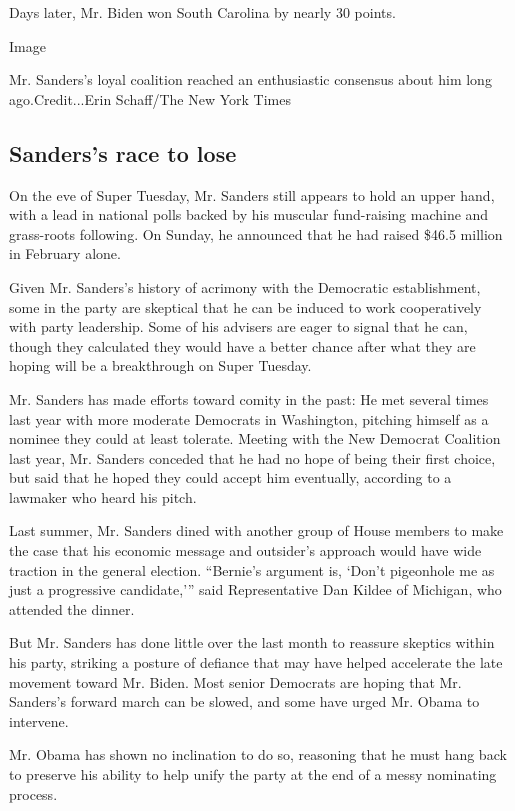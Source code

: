 Days later, Mr. Biden won South Carolina by nearly 30 points.

Image

Mr. Sanders's loyal coalition reached an enthusiastic consensus about
him long ago.Credit...Erin Schaff/The New York Times

\hypertarget{sanderss-race-to-lose}{%
\subsection{Sanders's race to lose}\label{sanderss-race-to-lose}}

On the eve of Super Tuesday, Mr. Sanders still appears to hold an upper
hand, with a lead in national polls backed by his muscular fund-raising
machine and grass-roots following. On Sunday, he announced that he had
raised \$46.5 million in February alone.

Given Mr. Sanders's history of acrimony with the Democratic
establishment, some in the party are skeptical that he can be induced to
work cooperatively with party leadership. Some of his advisers are eager
to signal that he can, though they calculated they would have a better
chance after what they are hoping will be a breakthrough on Super
Tuesday.

Mr. Sanders has made efforts toward comity in the past: He met several
times last year with more moderate Democrats in Washington, pitching
himself as a nominee they could at least tolerate. Meeting with the New
Democrat Coalition last year, Mr. Sanders conceded that he had no hope
of being their first choice, but said that he hoped they could accept
him eventually, according to a lawmaker who heard his pitch.

Last summer, Mr. Sanders dined with another group of House members to
make the case that his economic message and outsider's approach would
have wide traction in the general election. ``Bernie's argument is,
`Don't pigeonhole me as just a progressive candidate,''' said
Representative Dan Kildee of Michigan, who attended the dinner.

But Mr. Sanders has done little over the last month to reassure skeptics
within his party, striking a posture of defiance that may have helped
accelerate the late movement toward Mr. Biden. Most senior Democrats are
hoping that Mr. Sanders's forward march can be slowed, and some have
urged Mr. Obama to intervene.

Mr. Obama has shown no inclination to do so, reasoning that he must hang
back to preserve his ability to help unify the party at the end of a
messy nominating process.

